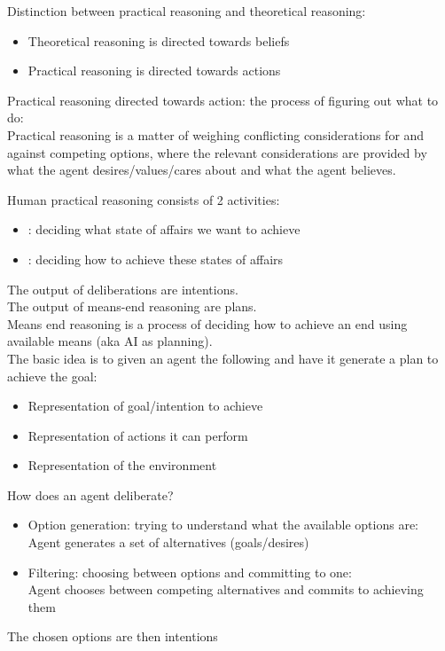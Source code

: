 Distinction between practical reasoning and theoretical reasoning:
\begin{itemize}
\item Theoretical reasoning is directed towards beliefs
\item Practical reasoning is directed towards actions
\end{itemize}
Practical reasoning directed towards action: the process of figuring out what to do:\\
Practical reasoning is a matter of weighing conflicting considerations for and against competing options, where the relevant considerations are provided by what the agent desires/values/cares about and what the agent believes.

Human practical reasoning consists of 2 activities:
\begin{itemize}
\item {}: deciding what state of affairs we want to achieve
\item {}: deciding how to achieve these states of affairs
\end{itemize}
The output of deliberations are intentions.\\
The output of means-end reasoning are plans.\\
Means end reasoning is a process of deciding how to achieve an end using available means (aka AI as planning).\\
The basic idea is to given an agent the following and have it generate a plan to achieve the goal:
\begin{itemize}
\item Representation of goal/intention to achieve
\item Representation of actions it can perform
\item Representation of the environment
\end{itemize}

How does an agent deliberate?
\begin{itemize}
\item Option generation: trying to understand what the available options are:\\
Agent generates a set of alternatives (goals/desires)
\item Filtering: choosing between options and committing to one:\\
Agent chooses between competing alternatives and commits to achieving them
\end{itemize}
The chosen options are then intentions
